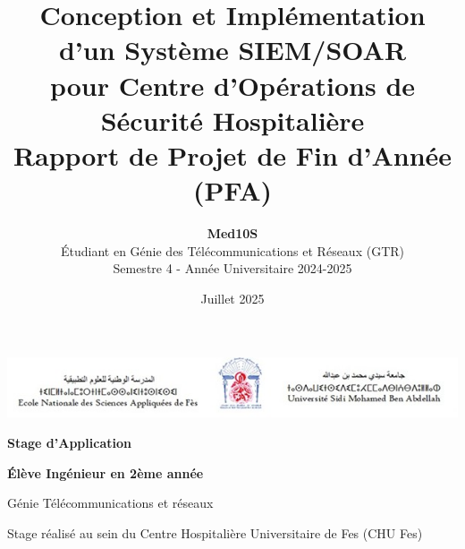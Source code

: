 \documentclass[12pt,a4paper,twoside]{report}
\title{%
    \textbf{Conception et Implémentation d'un Système SIEM/SOAR} \\
    \vspace{0.5cm}
    \large{pour Centre d'Opérations de Sécurité Hospitalière} \\
    \vspace{1cm}
    \normalsize{Rapport de Projet de Fin d'Année (PFA)}
}
\author{%
    \textbf{Med10S} \\
    \vspace{0.3cm}
    \small{Étudiant en Génie des Télécommunications et Réseaux (GTR)} \\
    \small{Semestre 4 - Année Universitaire 2024-2025}
}
\date{Juillet 2025}
\begin{document}
\begin{titlepage}
    \centering

    \begin{minipage}{\textwidth}
        \centering

        \includegraphics[]{images/USMBA_banner.jpg}


    \end{minipage}

    \vspace{4cm}    %
    {\Huge\bfseries Stage d’Application\par}
    \vspace{0.5cm}
    {\large\bfseries Élève Ingénieur en 2ème année\par}
    \vspace{0.3cm}
    {\large Génie Télécommunications et réseaux\par}
    {\large Stage réalisé au sein du Centre Hospitalière Universitaire de Fes (CHU Fes)\par}

    \vspace{1.5cm}





\end{titlepage}
\end{document}

